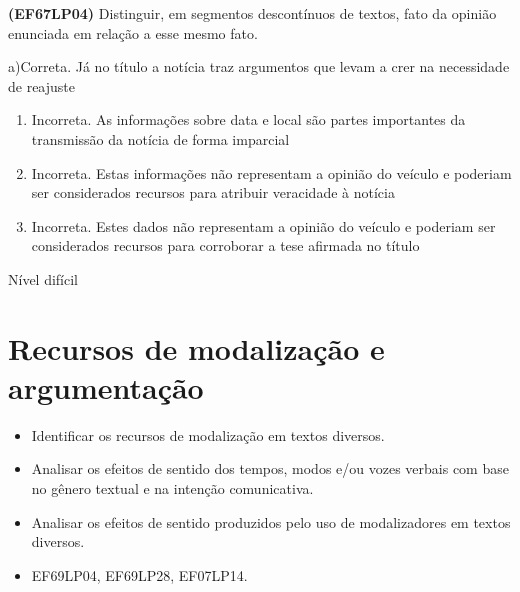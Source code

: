 {{\begin{escolha}
\textbf{(EF67LP04)} Distinguir, em segmentos descontínuos de textos,
fato da opinião enunciada em relação a esse mesmo fato.

a)Correta. Já no título a notícia traz argumentos que levam a crer na
necessidade de reajuste

\begin{enumerate}
\def\labelenumi{\arabic{enumi}.}
\item
  Incorreta. As informações sobre data e local são partes importantes da
  transmissão da notícia de forma imparcial
\item
  Incorreta. Estas informações não representam a opinião do veículo e
  poderiam ser considerados recursos para atribuir veracidade à notícia
\item
  Incorreta. Estes dados não representam a opinião do veículo e poderiam
  ser considerados recursos para corroborar a tese afirmada no título
\end{enumerate}

Nível difícil

\chapter{Recursos de modalização e argumentação}


\begin{itemize}

  \item Identificar os recursos de modalização em textos diversos.

  \item Analisar os efeitos de sentido dos tempos, modos e/ou vozes 
verbais com base no gênero textual e na intenção comunicativa.

  \item Analisar os efeitos de sentido produzidos pelo uso de modalizadores em textos diversos.

\end{itemize}


\begin{itemize}

  \item EF69LP04, EF69LP28, EF07LP14.

\end{itemize}

\end{escolha}}}
